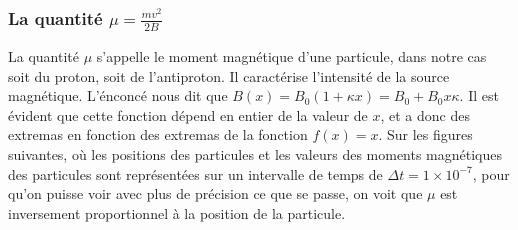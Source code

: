 \documentclass[a4paper,12pt,twoside]{article}
\begin{document}
\subsubsection{La quantit\'e $\mu = \frac{mv^2}{2B}$}
La quantit\'e $\mu$ s'appelle le moment magn\'etique d'une particule, dans notre cas soit du proton, soit de l'antiproton. Il caract\'erise l'intensit\'e de la source magn\'etique. L'\'enconc\'e \cite{Notes} nous dit que $B(x) = B_0(1 + \kappa x) = B_0 + B_0x\kappa$. Il est \'evident que cette fonction d\'epend en entier de la valeur de $x$, et a donc des extremas en fonction des extremas de la fonction $f(x) = x$. Sur les figures suivantes, o\`u les positions des particules et les valeurs des moments magn\'etiques des particules sont repr\'esent\'ees sur un intervalle de temps de $\Delta t = 1\times 10^{-7}$, pour qu'on puisse voir avec plus de pr\'ecision ce que se passe, on voit que $\mu$ est inversement proportionnel \`a la position de la particule.
\end{document}
